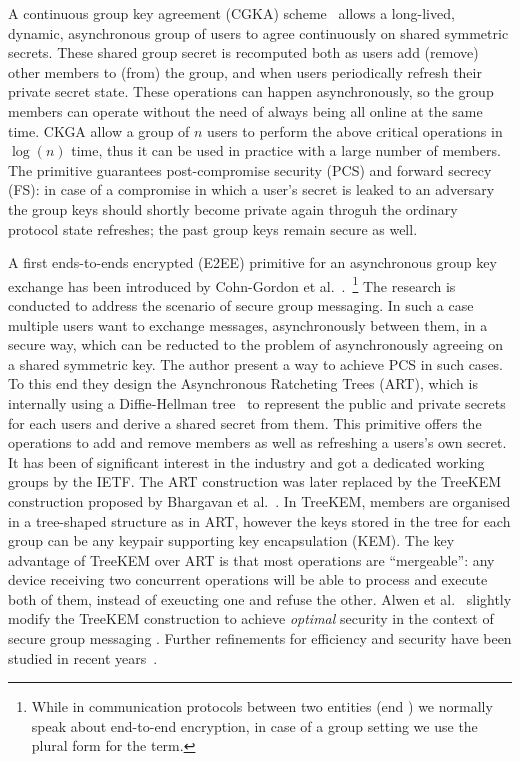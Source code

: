 A continuous group key agreement (CGKA) scheme~\cite{C:ACDT20}
allows a long-lived, dynamic, asynchronous group of users to agree 
continuously on shared symmetric secrets.
These shared group secret is recomputed both as users add (remove)
other members to (from) the group, and when users periodically
refresh their private secret state. These operations can happen
asynchronously, so the group members can operate without the need of always
being all online at the same time.
CKGA allow a group of $n$ users to perform the above critical 
operations in $\log(n)$ time,
thus it can be used in practice with a large number of members.
The primitive guarantees post-compromise security (PCS) and forward secrecy (FS):
in case of a compromise in which a user's secret is leaked
to an adversary the group keys should shortly become private
again throguh the ordinary protocol state refreshes; the past
group keys remain secure as well.

A first ends-to-ends encrypted (E2EE) primitive for an asynchronous group key exchange 
has been introduced by Cohn-Gordon et al.~\cite{CCS:CCGMM18}.~\footnote{While in communication protocols between two entities (end ) we normally speak about end-to-end encryption, in case of a group setting we use the plural form for the term.}
The research is conducted to address the scenario of secure group messaging.
In such a case multiple users want to exchange messages, asynchronously
between them, in a secure way, which can be reducted to the problem
of asynchronously agreeing on a shared symmetric key.
The author present a way to achieve PCS in such cases.
To this end they design the Asynchronous Ratcheting Trees (ART),
which is internally using a Diffie-Hellman tree~\cite{10.1145/1368310.1368347} 
to represent the public and private secrets for each users
and derive a shared secret from them.
This primitive offers the operations to add and remove members
as well as refreshing a users's own secret.
It has been of significant interest in the industry and
got a dedicated working groups by the IETF.
The ART construction was later replaced by the TreeKEM
construction proposed by Bhargavan et al.~\cite{TreeKEM}.
In TreeKEM, members are organised in a tree-shaped structure
as in ART, however the keys stored in the tree for each group
can be any keypair supporting key encapsulation (KEM).
The key advantage of TreeKEM over ART is that
most operations are ``mergeable'':
any device receiving two
concurrent operations will be able to process and execute both of them,
instead of exeucting one and refuse the other.
Alwen et al.~\cite{C:ACDT20} slightly modify the TreeKEM construction
to achieve \textit{optimal} security in the context of
secure group messaging .
Further refinements for efficiency and security have 
been studied in recent years~\cite{TCC:ACJM20, SP:KPWKCCMYAP21, CCS:ACDT21, CCS:AHKM22, EC:AANKPPW22, C:AlwJosMul22, C:AlwMulTse23, IWSPA:KEONO23}.

